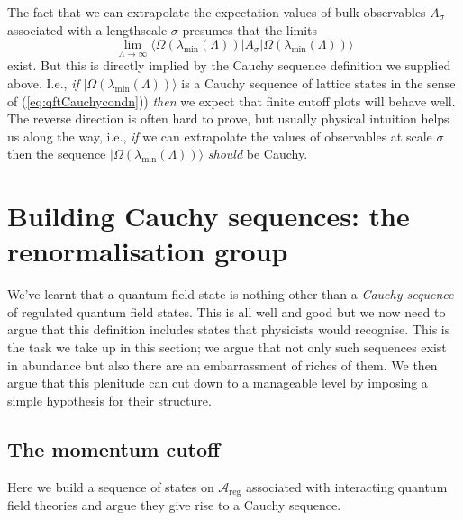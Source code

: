 \documentclass[11pt]{amsart}
\theoremstyle{plain}%
\theoremstyle{definition}
\theoremstyle{remark}
\begin{document}
The fact that we can extrapolate the expectation values of bulk observables $A_\sigma$ associated with a lengthscale $\sigma$ presumes that the limits
\begin{equation}
	\lim_{\Lambda \rightarrow \infty} \langle \Omega(\lambda_{\text{min}}(\Lambda))|A_\sigma|\Omega(\lambda_{\text{min}}(\Lambda))\rangle
\end{equation}
exist. But this is directly implied by the Cauchy sequence definition we supplied above. I.e., \emph{if} $|\Omega(\lambda_{\text{min}}(\Lambda))\rangle$ is a Cauchy sequence of lattice states in the sense of (\ref{eq:qftCauchycondn})) \emph{then} we expect that finite cutoff plots will behave well. The reverse direction is often hard to prove, but usually physical intuition helps us along the way, i.e., \emph{if} we can extrapolate the values of observables at scale $\sigma$ then the sequence $|\Omega(\lambda_{\text{min}}(\Lambda))\rangle$ \emph{should} be Cauchy.




\section{Building Cauchy sequences: the renormalisation group}\label{sec:Cauchyseqrg}

We've learnt that a quantum field state is nothing other than a \emph{Cauchy sequence} of regulated quantum field states. This is all well and good but we now need to argue that this definition includes states that physicists would recognise. This is the task we take up in this section; we argue that not only such sequences exist in abundance but also there are an embarrassment of riches of them. We then argue that this plenitude can cut down to a manageable level by imposing a simple hypothesis for their structure.

\subsection{The momentum cutoff}
Here we build a sequence of states on $\mathcal{A}_{\text{reg}}$ associated with interacting quantum field theories and argue they give rise to a Cauchy sequence. 
\end{document}
